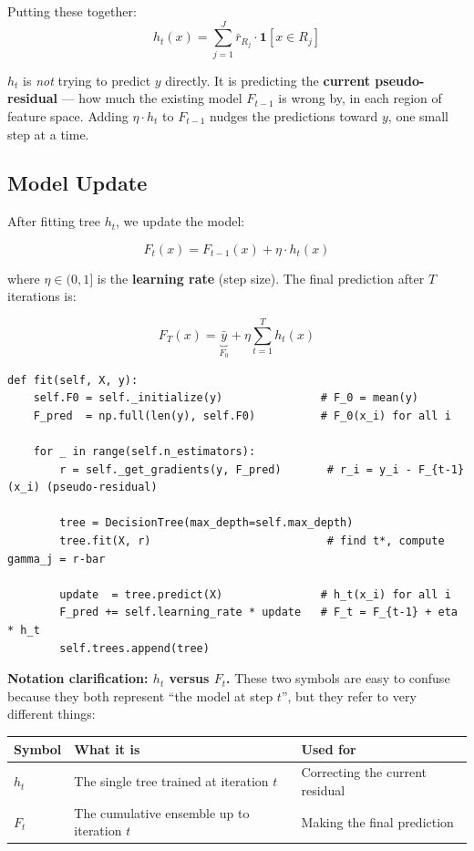 \documentclass[11pt, a4paper]{article}
\begin{document}
Putting these together:
\[
h_t(x) = \sum_{j=1}^J \bar{r}_{R_j} \cdot \mathbf{1}[x \in R_j]
\]

$h_t$ is \emph{not} trying to predict $y$ directly.
It is predicting the \textbf{current pseudo-residual} --- how much the existing
model $F_{t-1}$ is wrong by, in each region of feature space.
Adding $\eta \cdot h_t$ to $F_{t-1}$ nudges the predictions toward $y$,
one small step at a time.

\subsection{Model Update}

After fitting tree $h_t$, we update the model:

\[
F_t(x) = F_{t-1}(x) + \eta \cdot h_t(x)
\]

where $\eta \in (0, 1]$ is the \textbf{learning rate} (step size).
The final prediction after $T$ iterations is:

\[
F_T(x) = \underbrace{\bar{y}}_{F_0} + \eta \sum_{t=1}^T h_t(x)
\]

\begin{listing}[H]
\caption{Training loop (\texttt{vanilla\_gbm.py})}
\begin{verbatim}
def fit(self, X, y):
    self.F0 = self._initialize(y)               # F_0 = mean(y)
    F_pred  = np.full(len(y), self.F0)          # F_0(x_i) for all i

    for _ in range(self.n_estimators):
        r = self._get_gradients(y, F_pred)       # r_i = y_i - F_{t-1}(x_i) (pseudo-residual)

        tree = DecisionTree(max_depth=self.max_depth)
        tree.fit(X, r)                           # find t*, compute gamma_j = r-bar

        update  = tree.predict(X)               # h_t(x_i) for all i
        F_pred += self.learning_rate * update   # F_t = F_{t-1} + eta * h_t
        self.trees.append(tree)
\end{verbatim}
\end{listing}

\textbf{Notation clarification: $h_t$ versus $F_t$.}
These two symbols are easy to confuse because they both represent
``the model at step $t$'', but they refer to very different things:

\begin{center}
\begin{tabular}{lll}
\toprule
\textbf{Symbol} & \textbf{What it is} & \textbf{Used for} \\
\midrule
$h_t$ & The single tree trained at iteration $t$ & Correcting the current residual \\
$F_t$ & The cumulative ensemble up to iteration $t$ & Making the final prediction \\
\bottomrule
\end{tabular}
\end{center}
\end{document}
